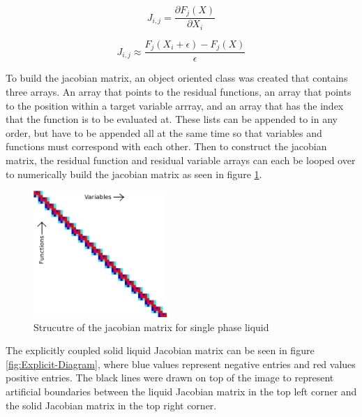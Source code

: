     \begin{equation}
    	\label{eq:jac_def}
    	J_{i,j}=\frac{ \partial F_{j}(X)}{\partial X_{i}}
    \end{equation}
    
    \begin{equation}
    	\label{eq:jac_numerical}
    	J_{i,j}  \approx \frac{F_{j}(X_{i}+\epsilon)-F_{j}(X)}{\epsilon}
    \end{equation}
    
    To build the jacobian matrix, an object oriented class was created that
    contains three arrays. An array that points to the residual functions, an
    array that points to the position within a target variable arrray, and an
    array that has the index that the function is to be evaluated at. These
    lists can be appended to in any order, but have to be appended all at the
    same time so that variables and functions must correspond with each other.
    Then to construct the jacobian matrix, the residual function and residual
    variable arrays can each be looped over to numerically build the jacobian
    matrix as seen in figure \ref{fig:Jacobian_Setup}. 
    
    \begin{figure}[!h]
    	\centering
    	\includegraphics[width=0.45\textwidth]{images/Jacobian_Setup}
    	\caption{Strucutre of the jacobian matrix for single phase liquid}
    	\label{fig:Jacobian_Setup}
    \end{figure}


	The explicitly coupled solid liquid Jacobian matrix can be seen in figure
	\ref{fig:Explicit-Diagram}, where blue values represent negative entries and
	red values positive entries. The black lines were drawn on top of the image to
	represent artificial boundaries between the liquid Jacobian matrix in the top
	left corner and the solid Jacobian matrix in the top right corner.
	
